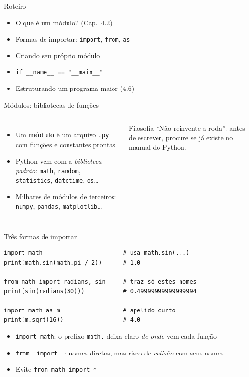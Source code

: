 \documentclass[aspectratio=169,10pt,t]{beamer}
\begin{document}
\capa

\begin{frame}{Roteiro}
  \begin{itemize}
    \item O que é um módulo? (Cap.~4.2)
    \item Formas de importar: \texttt{import}, \texttt{from}, \texttt{as}
    \item Criando seu próprio módulo
    \item \texttt{if \_\_name\_\_ == "\_\_main\_\_"}
    \item Estruturando um programa maior (4.6)
  \end{itemize}
\end{frame}

\begin{frame}{Módulos: bibliotecas de funções}
  \begin{columns}[T]
    \begin{itemize}
      \item Um \textbf{módulo} é um arquivo \texttt{.py} com funções e constantes prontas
      \item Python vem com a \emph{biblioteca padrão}: \texttt{math}, \texttt{random}, \texttt{statistics}, \texttt{datetime}, \texttt{os}\ldots
      \item Milhares de módulos de terceiros: \texttt{numpy}, \texttt{pandas}, \texttt{matplotlib}\ldots
    \end{itemize}
    \begin{exampleblock}{Filosofia}
      ``Não reinvente a roda'': antes de escrever, procure se já existe no manual do Python.
    \end{exampleblock}
  \end{columns}
\end{frame}

\begin{frame}[fragile]{Três formas de importar}
\begin{lstlisting}
import math                       # usa math.sin(...)
print(math.sin(math.pi / 2))      # 1.0

from math import radians, sin     # traz só estes nomes
print(sin(radians(30)))           # 0.49999999999999994

import math as m                  # apelido curto
print(m.sqrt(16))                 # 4.0
\end{lstlisting}
  \begin{itemize}
    \item \texttt{import math}: o prefixo \texttt{math.} deixa claro \emph{de onde} vem cada função
    \item \texttt{from \ldots import \ldots}: nomes diretos, mas risco de \emph{colisão} com seus nomes
    \item Evite \texttt{from math import *}
  \end{itemize}
\end{frame}
\end{document}
